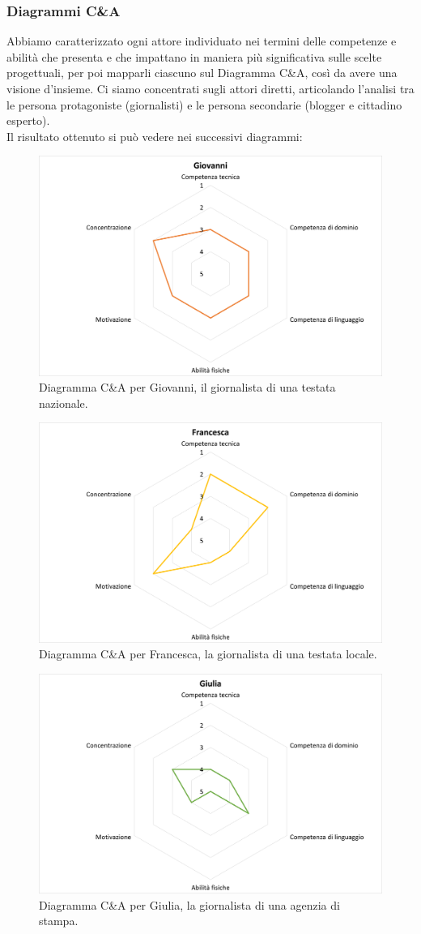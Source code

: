 \subsubsection{Diagrammi C\&A}
\label{sss:diagrammi-c_and_a}
Abbiamo caratterizzato ogni attore individuato nei termini delle competenze e abilità che presenta e che impattano in maniera più significativa sulle scelte progettuali, per poi mapparli ciascuno sul Diagramma C\&A, così da avere una visione d'insieme.
Ci siamo concentrati sugli attori diretti, articolando l'analisi tra le persona protagoniste (giornalisti) e le persona secondarie (blogger e cittadino esperto).\\
Il risultato ottenuto si può vedere nei successivi diagrammi:
\begin{figure}[H]
    \centering
    \includegraphics[width=0.5\columnwidth]{assets/images/proposta-design/caos/giovanni}
    \caption{Diagramma C\&A per Giovanni, il giornalista di una testata nazionale.}
\end{figure}

\begin{figure}[H]
    \centering
    \includegraphics[width=0.5\columnwidth]{assets/images/proposta-design/caos/francesca}
    \caption{Diagramma C\&A per Francesca, la giornalista di una testata locale.}
\end{figure}

\begin{figure}[H]
    \centering
    \includegraphics[width=0.5\columnwidth]{assets/images/proposta-design/caos/giulia}
    \caption{Diagramma C\&A per Giulia, la giornalista di una agenzia di stampa.}
\end{figure}

